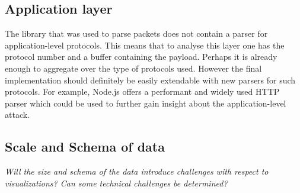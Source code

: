 \subsection{Application layer}
The library that was used to parse packets does not contain a parser for application-level protocols. This means that to analyse this layer one has the protocol number and a buffer containing the payload. Perhaps it is already enough to aggregate over the type of protocols used. However the final implementation should definitely be easily extendable with new parsers for such protocols. For example, Node.js offers a performant and widely used HTTP parser which could be used to further gain insight about the application-level attack.
     
\subsection{Scale and Schema of data}\label{scaleandschema}
\textit{Will the size and schema of the data introduce challenges with respect to visualizations? Can some technical challenges be determined?
}

